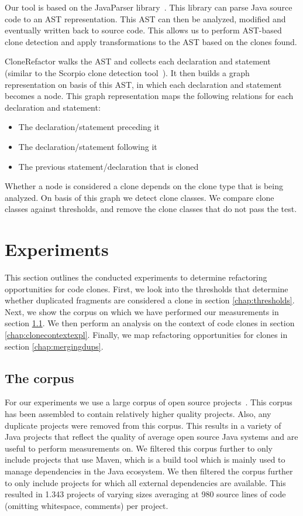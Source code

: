 \documentclass[a4paper]{article}
\begin{document}
Our tool is based on the JavaParser library~\cite{tomassetti2017javaparser}. This library can parse Java source code to an AST representation. This AST can then be analyzed, modified and eventually written back to source code. This allows us to perform AST-based clone detection and apply transformations to the AST based on the clones found.

CloneRefactor walks the AST and collects each declaration and statement (similar to the Scorpio clone detection tool~\cite{higo2013revisiting}). It then builds a graph representation on basis of this AST, in which each declaration and statement becomes a node. This graph representation maps the following relations for each declaration and statement:

\begin{itemize}
  \item The declaration/statement preceding it
  \item The declaration/statement following it
  \item The previous statement/declaration that is cloned
\end{itemize}

Whether a node is considered a clone depends on the clone type that is being analyzed. On basis of this graph we detect clone classes. We compare clone classes against thresholds, and remove the clone classes that do not pass the test.

\section{Experiments}
This section outlines the conducted experiments to determine refactoring opportunities for code clones. First, we look into the thresholds that determine whether duplicated fragments are considered a clone in section \ref{chap:thresholds}. Next, we show the corpus on which we have performed our measurements in section \ref{chap:corpus}. We then perform an analysis on the context of code clones in section \ref{chap:clonecontextexpl}. Finally, we map refactoring opportunities for clones in section \ref{chap:mergingdups}.

\subsection{The corpus}\label{chap:corpus}
For our experiments we use a large corpus of open source projects~\cite{githubCorpus2013}. This corpus has been assembled to contain relatively higher quality projects. Also, any duplicate projects were removed from this corpus. This results in a variety of Java projects that reflect the quality of average open source Java systems and are useful to perform measurements on. We filtered this corpus further to only include projects that use Maven, which is a build tool which is mainly used to manage dependencies in the Java ecosystem. We then filtered the corpus further to only include projects for which all external dependencies are available. This resulted in 1.343 projects of varying sizes averaging at 980 source lines of code (omitting whitespace, comments) per project.
\end{document}
